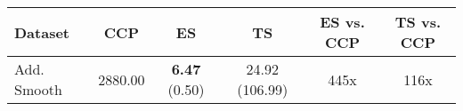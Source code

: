 \begin{tabular}{lccccc}
\toprule
Dataset & CCP & ES & TS & ES vs. CCP & TS vs. CCP \\
\midrule
Add. Smooth & 2880.00 & \textbf{6.47} (0.50) & 24.92 (106.99) & 445x & 116x \\
\bottomrule
\end{tabular}